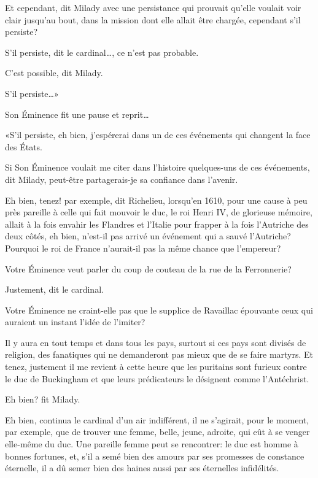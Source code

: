 \speak  Et cependant, dit Milady avec une persistance qui prouvait qu'elle voulait voir clair jusqu'au bout, dans la mission dont elle allait être chargée, cependant s'il persiste? 

\speak  S'il persiste, dit le cardinal\dots, ce n'est pas probable. 

\speak  C'est possible, dit Milady. 

\speak  S'il persiste\dots» 

Son Éminence fit une pause et reprit\dots 

«S'il persiste, eh bien, j'espérerai dans un de ces événements qui changent la face des États. 

\speak  Si Son Éminence voulait me citer dans l'histoire quelques-uns de ces événements, dit Milady, peut-être partagerais-je sa confiance dans l'avenir. 

\speak  Eh bien, tenez! par exemple, dit Richelieu, lorsqu'en 1610, pour une cause à peu près pareille à celle qui fait mouvoir le duc, le roi Henri IV, de glorieuse mémoire, allait à la fois envahir les Flandres et l'Italie pour frapper à la fois l'Autriche des deux côtés, eh bien, n'est-il pas arrivé un événement qui a sauvé l'Autriche? Pourquoi le roi de France n'aurait-il pas la même chance que l'empereur? 

\speak  Votre Éminence veut parler du coup de couteau de la rue de la Ferronnerie? 

\speak  Justement, dit le cardinal. 

\speak  Votre Éminence ne craint-elle pas que le supplice de Ravaillac épouvante ceux qui auraient un instant l'idée de l'imiter? 

\speak  Il y aura en tout temps et dans tous les pays, surtout si ces pays sont divisés de religion, des fanatiques qui ne demanderont pas mieux que de se faire martyrs. Et tenez, justement il me revient à cette heure que les puritains sont furieux contre le duc de Buckingham et que leurs prédicateurs le désignent comme l'Antéchrist. 

\speak  Eh bien? fit Milady. 

\speak  Eh bien, continua le cardinal d'un air indifférent, il ne s'agirait, pour le moment, par exemple, que de trouver une femme, belle, jeune, adroite, qui eût à se venger elle-même du duc. Une pareille femme peut se rencontrer: le duc est homme à bonnes fortunes, et, s'il a semé bien des amours par ses promesses de constance éternelle, il a dû semer bien des haines aussi par ses éternelles infidélités. 

